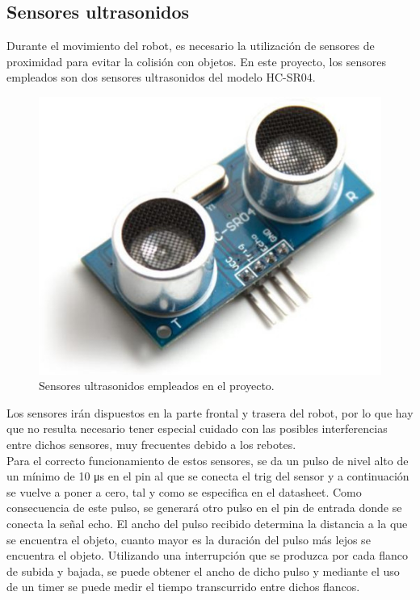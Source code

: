\subsection{Sensores ultrasonidos}
\label{sec:ultrasonido}

Durante el movimiento del robot, es necesario la utilización de sensores de proximidad para
evitar la colisión con objetos. En este proyecto, los sensores empleados son dos sensores
ultrasonidos del modelo HC-SR04.\\

\begin{figure}[H]
  \begin{center}
    \includegraphics[scale=0.4]{imagenes/ultrasonido.jpg}
  \end{center}
  \caption{Sensores ultrasonidos empleados en el proyecto.}
  \label{figura:rpi-modulo-bateria}
\end{figure}

Los sensores irán dispuestos en la parte frontal y trasera del robot, por lo que hay que no resulta necesario tener especial
cuidado con las posibles interferencias entre dichos sensores, muy frecuentes debido a los rebotes.\\

Para el correcto funcionamiento de estos sensores, se da un pulso de nivel alto de un mínimo de
10 μs en el pin al que se conecta el trig del sensor y a continuación se vuelve a poner a cero, tal y
como se especifica en el datasheet. Como consecuencia de este pulso, se generará otro pulso en
el pin de entrada donde se conecta la señal echo. El ancho del pulso recibido determina la
distancia a la que se encuentra el objeto, cuanto mayor es la duración del pulso más lejos se
encuentra el objeto. Utilizando una interrupción que se produzca por cada flanco de subida y
bajada, se puede obtener el ancho de dicho pulso y mediante el uso de un timer se puede medir el
tiempo transcurrido entre dichos flancos.\\


